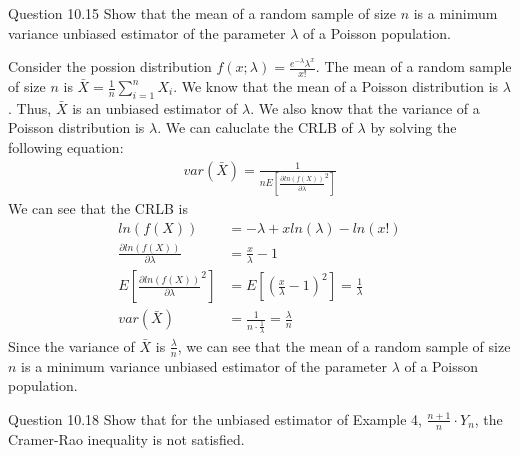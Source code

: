 \documentclass[answers,12pt,addpoints]{exam}
\begin{document}
\begin{questions}
\begin{solution}
    \end{solution}
    \question Question 10.15
    Show that the mean of a random sample of size $n$ is a
    minimum variance unbiased estimator of the parameter
    $\lambda$ of a Poisson population. 
    \begin{solution}
        Consider the possion distribution $f(x; \lambda) = \frac{e^{-\lambda} \lambda^x}{x!}$.
        The mean of a random sample of size $n$ is $\bar{X} = \frac{1}{n} \sum_{i=1}^{n} X_i$. We know that the mean of a Poisson distribution is $\lambda$. Thus, $\bar{X}$ is an unbiased estimator of $\lambda$. We also know that the variance of a Poisson distribution is $\lambda$. We can caluclate the CRLB of $\lambda$ by solving the following equation:
        \begin{align*}
            var(\bar{X}) = \frac{1}{n E\left[\frac{\partial ln(f(X))}{\partial \lambda}^2 \right]}
        \end{align*}
        We can see that the CRLB is 
        \begin{align*}
            ln(f(X)) &= -\lambda + x ln(\lambda) - ln(x!) \\
            \frac{\partial ln(f(X))}{\partial \lambda} &= \frac{x}{\lambda} - 1 \\
            E\left[\frac{\partial ln(f(X))}{\partial \lambda}^2 \right] &= E\left[\left(\frac{x}{\lambda} - 1\right)^2 \right] = \frac{1}{\lambda}\\
            var(\bar{X}) &= \frac{1}{n \cdot \frac{1}{\lambda}} = \frac{\lambda}{n}
        \end{align*}
        Since the variance of $\bar{X}$ is $\frac{\lambda}{n}$, we can see that the mean of a random sample of size $n$ is a minimum variance unbiased estimator of the parameter $\lambda$ of a Poisson population.
    \end{solution}
    \question Question 10.18
    Show that for the unbiased estimator of Example 4, $\frac{n + 1}{n} \cdot Y_n$, the Cramer-Rao inequality is not satisfied.


\end{questions}
\end{document}
